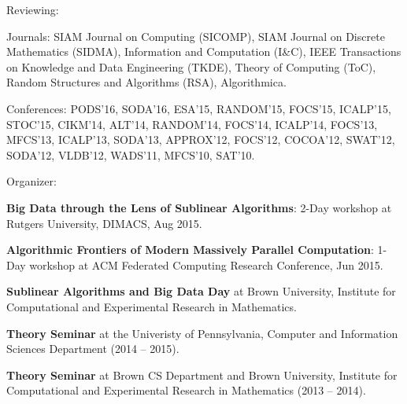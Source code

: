 \documentclass[11pt]{article}
\newenvironment{innerlist}[1][\enskip\textbullet]%
        {\begin{compactitem}[#1]}{\end{compactitem}}
\newcommand{\blankline}{\quad\pagebreak[2]}
\begin{document}
\blankline

Reviewing:

\begin{innerlist}
	\item Journals: SIAM Journal on Computing (SICOMP), SIAM Journal on Discrete Mathematics (SIDMA), Information and Computation (I\&C), IEEE Transactions on Knowledge and Data Engineering (TKDE), Theory of Computing (ToC), Random Structures and Algorithms (RSA), Algorithmica.
	\item Conferences: PODS'16, SODA'16, ESA'15, RANDOM'15, FOCS'15, ICALP'15, STOC'15, CIKM'14, ALT'14, RANDOM'14, FOCS'14, ICALP'14, FOCS'13, MFCS'13, ICALP'13, SODA'13, APPROX'12, FOCS'12, COCOA'12, SWAT'12, SODA'12, VLDB'12, WADS'11, MFCS'10, SAT'10.
\end{innerlist}

\blankline

Organizer:
\begin{innerlist}
	\item \textbf{Big Data through the Lens of Sublinear Algorithms}: 2-Day workshop at Rutgers University, DIMACS, Aug 2015.
	\item \textbf{Algorithmic Frontiers of Modern Massively Parallel Computation}: 1-Day workshop at ACM Federated Computing Research Conference, Jun 2015.
	\item \textbf{Sublinear Algorithms and Big Data Day} at Brown University, Institute for Computational and Experimental Research in Mathematics.
	\item \textbf{Theory Seminar} at the Univeristy of Pennsylvania, Computer and Information Sciences Department (2014 -- 2015).
	\item \textbf{Theory Seminar} at Brown CS Department and Brown University, Institute for Computational and Experimental Research in Mathematics (2013 -- 2014).
\end{innerlist}
\end{document}
